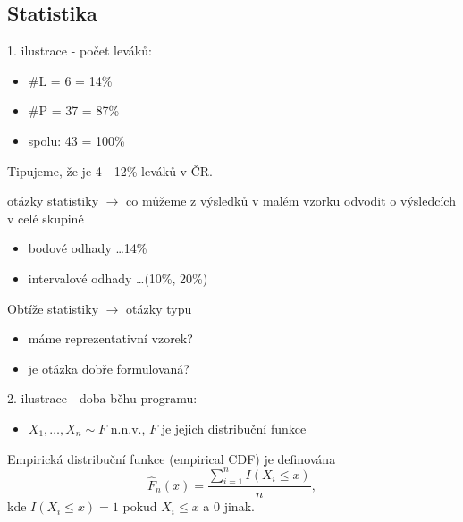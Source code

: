 \documentclass[../main.tex]{subfiles}
\begin{document}
\subsection{Statistika}
\begin{example}
    1. ilustrace - počet leváků:\\
    \begin{itemize}
        \item \#L = 6 = 14\%
        \item \#P = 37 = 87\%
        \item spolu: 43 = 100\%
    \end{itemize}
    Tipujeme, že je 4 - 12\% leváků v ČR.\\
    \begin{remark}

        otázky statistiky $\rightarrow$ co můžeme z výsledků v malém vzorku odvodit o výsledcích v celé skupině
        \begin{itemize}
        \item bodové odhady \dots 14\%
        \item intervalové odhady \dots (10\%, 20\%)
        \end{itemize}
        Obtíže statistiky $\rightarrow$ otázky typu
        \begin{itemize}
            \item máme reprezentativní vzorek?
            \item je otázka dobře formulovaná?
        \end{itemize}
    \end{remark}
\end{example}
\begin{example}
    2. ilustrace - doba běhu programu:\\
    \begin{itemize}
        \item $X_1,\dots,X_n \sim F$ n.n.v., $F$ je jejich distribuční funkce
    \end{itemize}
    \begin{definition}
        Empirická distribuční funkce (empirical CDF) je definována
        \[\hat{F}_n(x) = \frac{\sum^n_{i=1}I(X_i \leq x)}{n},\]
        kde $I(X_i \leq x) = 1$ pokud $X_i \leq x$ a 0 jinak.
    \end{definition}
\end{example}
\end{document}
